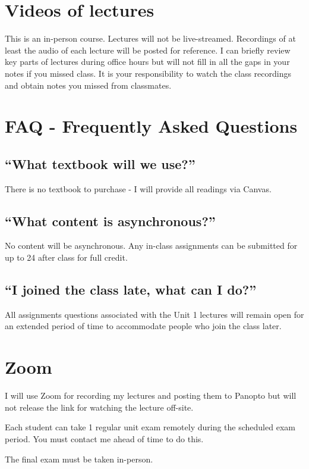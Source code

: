 \documentclass[
]{book}
\begin{document}
\hypertarget{videos-of-lectures}{%
\chapter{Videos of lectures}\label{videos-of-lectures}}

This is an in-person course. Lectures will not be live-streamed. Recordings of at least the audio of each lecture will be posted for reference. I can briefly review key parts of lectures during office hours but will not fill in all the gaps in your notes if you missed class. It is your responsibility to watch the class recordings and obtain notes you missed from classmates.

\hypertarget{faq---frequently-asked-questions}{%
\chapter{FAQ - Frequently Asked Questions}\label{faq---frequently-asked-questions}}

\hypertarget{what-textbook-will-we-use}{%
\section{``What textbook will we use?''}\label{what-textbook-will-we-use}}

There is no textbook to purchase - I will provide all readings via Canvas.

\hypertarget{what-content-is-asynchronous}{%
\section{``What content is asynchronous?''}\label{what-content-is-asynchronous}}

No content will be asynchronous. Any in-class assignments can be submitted for up to 24 after class for full credit.

\hypertarget{i-joined-the-class-late-what-can-i-do}{%
\section{``I joined the class late, what can I do?''}\label{i-joined-the-class-late-what-can-i-do}}

All assignments questions associated with the Unit 1 lectures will remain open for an extended period of time to accommodate people who join the class later.

\hypertarget{zoom}{%
\chapter{Zoom}\label{zoom}}

I will use Zoom for recording my lectures and posting them to Panopto but will not release the link for watching the lecture off-site.

Each student can take 1 regular unit exam remotely during the scheduled exam period. You must contact me ahead of time to do this.

The final exam must be taken in-person.
\end{document}
